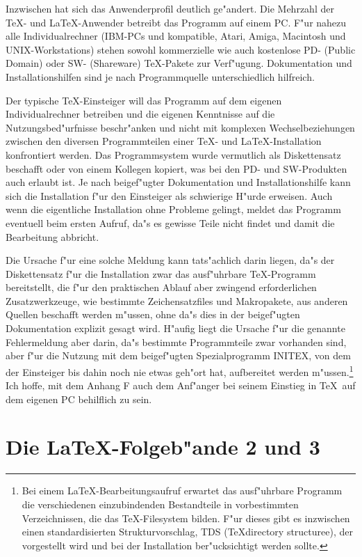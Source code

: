 \documentclass{article}
\begin{document}
Inzwischen hat sich das Anwenderprofil deutlich ge"andert. Die Mehrzahl
der \TeX- und \LaTeX-Anwender betreibt das Programm auf einem PC. 
F"ur nahezu alle Individualrechner (IBM-PCs und kompatible, Atari, Amiga,
Macintosh und UNIX-Workstations) stehen sowohl kommerzielle wie auch
kostenlose PD- (Public Domain) oder SW- (Shareware) \TeX-Pakete zur 
Verf"ugung. Dokumentation und Installationshilfen sind je nach Programmquelle
unterschiedlich hilfreich. 

Der typische \TeX-Einsteiger will das Programm auf dem eigenen 
Individualrechner betreiben und die eigenen Kenntnisse auf die 
Nutzungsbed"urfnisse beschr"anken und nicht mit komplexen Wechselbeziehungen
zwischen den diversen Programmteilen einer \TeX- und \LaTeX-Installation
konfrontiert werden. Das Programmsystem wurde vermutlich als Diskettensatz
beschafft oder von einem Kollegen kopiert, was bei den PD- und SW-Produkten
auch erlaubt ist. Je nach beigef"ugter Dokumentation und Installationshilfe
kann sich die Installation f"ur den Einsteiger als schwierige H"urde erweisen.
Auch wenn die eigentliche Installation ohne Probleme gelingt, meldet das
Programm eventuell beim ersten Aufruf, da"s es gewisse Teile nicht findet und
damit die Bearbeitung abbricht.          

Die Ursache f"ur eine solche Meldung kann tats"achlich darin liegen, da"s
der Diskettensatz f"ur die Installation zwar das ausf"uhrbare \TeX-Programm
bereitstellt, die f"ur den praktischen Ablauf aber zwingend erforderlichen
Zusatzwerkzeuge, wie bestimmte Zeichensatzfiles und Makropakete, aus anderen
Quellen beschafft werden m"ussen, ohne da"s dies in der beigef"ugten
Dokumentation explizit gesagt wird. H"aufig liegt die Ursache f"ur die
genannte Fehlermeldung aber darin, da"s bestimmte Programmteile zwar vorhanden
sind, aber f"ur die Nutzung mit dem beigef"ugten Spezialprogramm INITEX, 
von dem der Einsteiger bis dahin noch nie etwas geh"ort hat, aufbereitet werden
m"ussen.\footnote{Bei einem \LaTeX-Bearbeitungsaufruf erwartet das ausf"uhrbare
Programm die verschiedenen einzubindenden Bestandteile in vorbestimmten
Verzeichnissen, die das \TeX-Filesystem bilden. F"ur dieses gibt es inzwischen
einen standardisierten Strukturvorschlag, TDS (\TeX directory structuree),
der vorgestellt wird und bei der Installation ber"ucksichtigt werden sollte.}
Ich hoffe, mit dem Anhang F auch dem Anf"anger bei seinem Einstieg in \TeX\
auf dem eigenen PC behilflich  zu sein.

\section{Die \LaTeX-Folgeb"ande 2 und 3}
\end{document}
